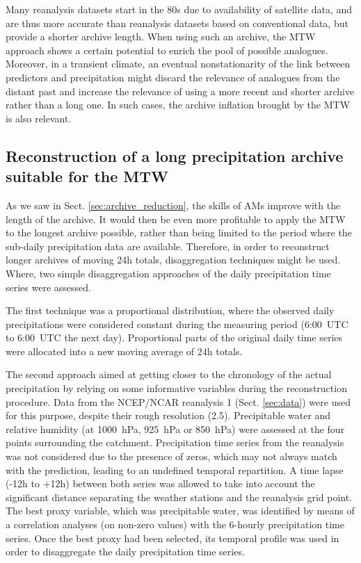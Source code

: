 \documentclass[hess, manuscript]{copernicus}
\begin{document}
	Many reanalysis datasets start in the 80s due to availability of satellite data, and are thus more accurate than reanalysis datasets based on conventional data, but provide a shorter archive length. When using such an archive, the MTW approach shows a certain potential to enrich the pool of possible analogues. Moreover, in a transient climate, an eventual nonstationarity of the link between predictors and precipitation might discard the relevance of analogues from the distant past and increase the relevance of using a more recent and shorter archive rather than a long one. In such cases, the archive inflation brought by the MTW is also relevant.
	
	
	\subsection{Reconstruction of a long precipitation archive suitable for the MTW}
	\label{sec:reconstruction}
	
	As we saw in Sect. \ref{sec:archive_reduction}, the skills of AMs improve with the length of the archive. It would then be even more profitable to apply the MTW to the longest archive possible, rather than being limited to the period where the sub-daily precipitation data are available. Therefore, in order to reconstruct longer archives of moving 24h totals, disaggregation techniques might be used. Where, two simple disaggregation approaches of the daily precipitation time series were assessed.
	
	The first technique was a proportional distribution, where the observed daily precipitations were considered constant during the measuring period (6:00~UTC to 6:00~UTC the next day). Proportional parts of the original daily time series were allocated into a new moving average of 24h totals. 

	The second approach aimed at getting closer to the chronology of the actual precipitation by relying on some informative variables during the reconstruction procedure. Data from the NCEP/NCAR reanalysis 1 (Sect. \ref{sec:data}) were used for this purpose, despite their rough resolution (2.5\textdegree). Precipitable water and relative humidity (at 1000~hPa, 925~hPa or 850~hPa) were assessed at the four points surrounding the catchment. Precipitation time series from the reanalysis was not considered due to the presence of zeros, which may not always match with the prediction, leading to an undefined temporal repartition. A time lapse (-12h to +12h) between both series was allowed to take into account the significant distance separating the weather stations and the reanalysis grid point. The best proxy variable, which was precipitable water, was identified by means of a correlation analyses (on non-zero values) with the 6-hourly precipitation time series. Once the best proxy had been selected, its temporal profile was used in order to disaggregate the daily precipitation time series.
	
\end{document}

